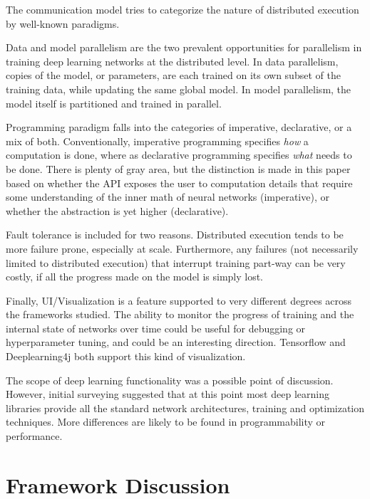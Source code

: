 \documentclass{article}
\begin{document}
The communication model tries to categorize the nature of distributed execution by well-known paradigms. 

Data and model parallelism are the two prevalent opportunities for parallelism in training deep learning networks at the distributed level. In data parallelism, copies of the model, or parameters, are each trained on its own subset of the training data, while updating the same global model. In model parallelism, the model itself is partitioned and trained in parallel. 

Programming paradigm falls into the categories of imperative, declarative, or a mix of both. Conventionally, imperative programming specifies \textit{how} a computation is done, where as declarative programming specifies \textit{what} needs to be done. There is plenty of gray area, but the distinction is made in this paper based on whether the API exposes the user to computation details that require some understanding of the inner math of neural networks (imperative), or whether the abstraction is yet higher (declarative). 

Fault tolerance is included for two reasons. Distributed execution tends to be more failure prone, especially at scale. Furthermore, any failures (not necessarily limited to distributed execution) that interrupt training part-way can be very costly, if all the progress made on the model is simply lost. 

Finally, UI/Visualization is a feature supported to very different degrees across the frameworks studied. The ability to monitor the progress of training and the internal state of networks over time could be useful for debugging or hyperparameter tuning, and could be an interesting direction. Tensorflow and Deeplearning4j both support this kind of visualization. 

The scope of deep learning functionality was a possible point of discussion. However, initial surveying suggested that at this point most deep learning libraries provide all the standard network architectures, training and optimization techniques. More differences are likely to be found in programmability or performance. 

\section{Framework Discussion}
\end{document}
